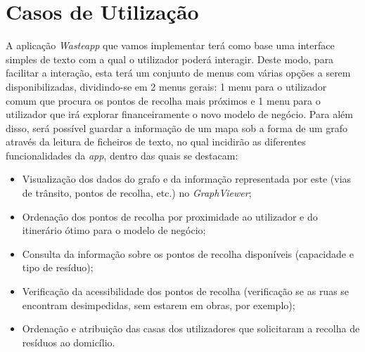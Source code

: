 \documentclass[article, a4paper, 12pt, oneside]{memoir}
\begin{document}
\chapter[Casos de Utilização][Casos de Utilização]{Casos de Utilização} \label{\thechapter}

A aplicação \textit{Wasteapp} que vamos implementar terá como base uma interface simples de texto com a qual o utilizador poderá interagir. Deste modo, para facilitar a interação, esta terá um conjunto de menus com várias opções a serem disponibilizadas, dividindo-se em 2 menus gerais: 1 menu para o utilizador comum que procura os pontos de recolha mais próximos e 1 menu para o utilizador que irá explorar financeiramente o novo modelo de negócio.
Para além disso, será possível guardar a informação de um mapa sob a forma de um grafo através da leitura de ficheiros de texto, no qual incidirão as diferentes funcionalidades da \textit{app}, dentro das quais se destacam:

\begin{itemize}
\item Visualização dos dados do grafo e da informação representada por este (vias de trânsito, pontos de recolha, etc.) no \textit{GraphViewer};
\item Ordenação dos pontos de recolha por proximidade ao utilizador e do itinerário ótimo para o modelo de negócio;
\item Consulta da informação sobre os pontos de recolha disponíveis (capacidade e tipo de resíduo);
\item Verificação da acessibilidade dos pontos de recolha (verificação se as ruas se encontram desimpedidas, sem estarem em obras, por exemplo);
\item Ordenação e atribuição das casas dos utilizadores que solicitaram a recolha de resíduos ao domicílio.

\end{itemize}
\end{document}
